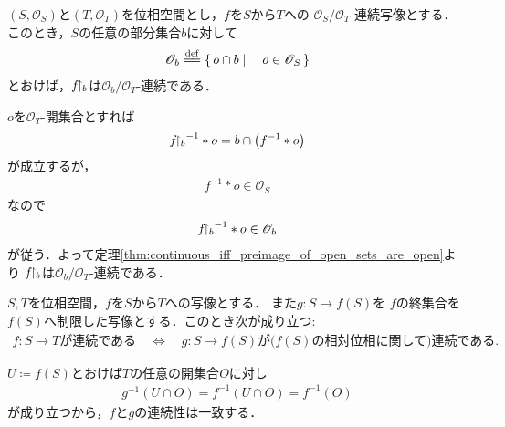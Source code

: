 	\begin{screen}
		\begin{thm}[定義域を制限しても連続]
			$(S,\mathscr{O}_{S})$と$(T,\mathscr{O}_{T})$を位相空間とし，$f$を$S$から$T$への
			$\mathscr{O}_{S}/\mathscr{O}_{T}$-連続写像とする．
			このとき，$S$の任意の部分集合$b$に対して
			\begin{align}
				\mathscr{O}_{b} \defeq \Set{o \cap b}{o \in \mathscr{O}_{S}}
			\end{align}
			とおけば，$f \hspace{-0.41em}\upharpoonright_{b}$は$\mathscr{O}_{b}/\mathscr{O}_{T}$-連続である．
		\end{thm}
	\end{screen}
	
	\begin{sketch}
		$o$を$\mathscr{O}_{T}$-開集合とすれば
		\begin{align}
			{f \hspace{-0.41em}\upharpoonright_{b}}^{-1} \ast o = b \cap \left( f^{-1} \ast o \right)
		\end{align}
		が成立するが，
		\begin{align}
			f^{-1} \ast o \in \mathscr{O}_{S}
		\end{align}
		なので
		\begin{align}
			{f \hspace{-0.41em}\upharpoonright_{b}}^{-1} \ast o \in \mathscr{O}_{b}
		\end{align}
		が従う．よって定理\ref{thm:continuous_iff_preimage_of_open_sets_are_open}より
		$f \hspace{-0.41em}\upharpoonright_{b}$は$\mathscr{O}_{b}/\mathscr{O}_{T}$-連続である．
		\QED
	\end{sketch}
	
	\begin{screen}
		\begin{thm}[部分空間と制限写像の連続性]
			$S,T$を位相空間，$f$を$S$から$T$への写像とする．
			また$g:S \longrightarrow f(S)$を
			$f$の終集合を$f(S)$へ制限した写像とする．このとき次が成り立つ:
			\begin{align}
				\mbox{$f:S \longrightarrow T$が連続である} 
				\quad \Longleftrightarrow \quad
				\mbox{$g:S \longrightarrow f(S)$が($f(S)$の相対位相に関して)連続である}.
			\end{align}
		\end{thm}
	\end{screen}
	
	\begin{prf}
		$U \coloneqq f(S)$とおけば$T$の任意の開集合$O$に対し
		\begin{align}
			g^{-1}(U \cap O) = f^{-1}(U \cap O) = f^{-1}(O)
		\end{align}
		が成り立つから，$f$と$g$の連続性は一致する．
		\QED
	\end{prf}